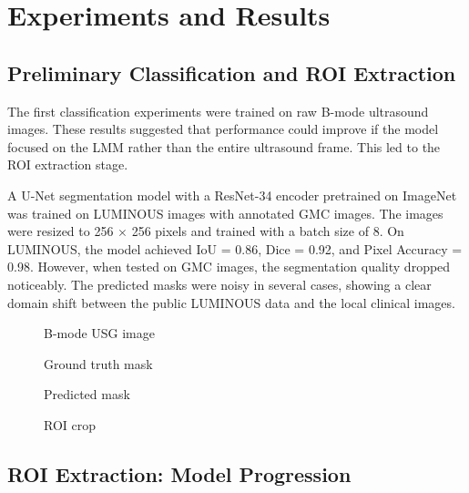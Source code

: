 \chapter{Experiments and Results}
\label{chap:experiments_results}
\label{workdone}
\section{Preliminary Classification and ROI Extraction}
The first classification experiments were trained on raw B-mode ultrasound images. These results suggested that performance could improve if the model focused on the LMM rather than the entire ultrasound frame. This led to the ROI extraction stage.

A U-Net segmentation model with a ResNet-34 encoder pretrained on ImageNet was trained on LUMINOUS images with annotated GMC images. The images were resized to 256 $\times$ 256 pixels and trained with a batch size of 8. On LUMINOUS, the model achieved IoU = 0.86, Dice = 0.92, and Pixel Accuracy = 0.98. However, when tested on GMC images, the segmentation quality dropped noticeably. The predicted masks were noisy in several cases, showing a clear domain shift between the public LUMINOUS data and the local clinical images.

\begin{figure}[H]
\centering
{}
\caption{B-mode USG image}
\label{fig:bmode}
\end{figure}

\begin{figure}[H]
\centering
{}
\caption{Ground truth mask}
\label{fig:groundtruth}
\end{figure}

\begin{figure}[H]
\centering
{}
\caption{Predicted mask}
\label{fig:predmask}
\end{figure}

\begin{figure}[H]
\centering
{}
\caption{ROI crop}
\label{fig:roi}
\end{figure}

\section{ROI Extraction: Model Progression}
